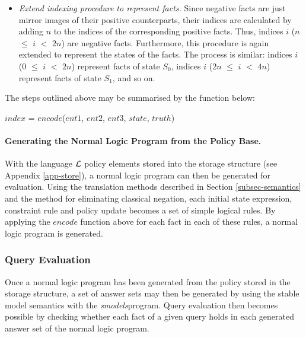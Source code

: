 \documentclass[global,twocolumn,final]{svjour}
\newenvironment{vquote}
  {\begin{list}{}{\leftmargin 1em}\item[]}
  {\end{list}}
\begin{document}
\begin{itemize}
            \item
              {\em Extend indexing procedure to represent facts.} Since
              negative facts are just mirror images of their positive
              counterparts, their indices are calculated by adding $n$ to the
              indices of the corresponding positive facts. Thus, indices $i$
              ($n$ $\leq$ $i$ $<$ $2n$) are negative facts. Furthermore, this
              procedure is again extended to represent the states of the
              facts. The process is similar: indices $i$ ($0$ $\leq$ $i$ $<$
              $2n$) represent facts of state $S_{0}$, indices $i$ ($2n$ $\leq$
              $i$ $<$ $4n$) represent facts of state $S_{1}$, and so on.
          \end{itemize}

          The steps outlined above may be summarised by the function below:

          \begin{vquote}
            $index$ = $encode$($ent1$, $ent2$, $ent3$, $state$, $truth$)
          \end{vquote}

        \paragraph{Generating the Normal Logic Program from the Policy Base.}

          With the language ${\cal L}$ policy elements stored into the storage
          structure (see Appendix \ref{app-store}), a normal logic program can
          then be generated for evaluation. Using the translation methods
          described in Section \ref{subsec-semantics} and the method for
          eliminating classical negation, each initial state expression,
          constraint rule and policy update becomes a set of simple logical
          rules. By applying the $encode$ function above for each fact in each
          of these rules, a normal logic program is generated.

      \subsubsection{Query Evaluation}

        Once a normal logic program has been generated from the policy stored
        in the storage structure, a set of answer sets may then be generated
        by using the stable model semantics \cite{SIM} with the
        {\em smodels}\footnotemark program. Query evaluation then becomes
        possible by checking whether each fact of a given query holds in each
        generated answer set of the normal logic program.
\end{document}
